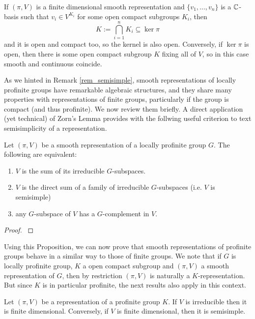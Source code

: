 \begin{rem}
    If $(\pi,V)$ is a finite dimensional smooth representation and $\{v_1,\ldots,v_n\}$ is a $\mathbb{C}$-basis such that $v_i\in V^{K_i}$ for some open compact subgroups $K_i$, then 
    $$K:=\bigcap_{i=1}^n K_i\subseteq\ker\pi$$
    and it is open and compact too, so the kernel is also open. 
    Conversely, if $\ker\pi$ is open, then there is some open compact subgroup $K$ fixing all of $V$, so in this case smooth and continuous coincide. 
\end{rem}


As we hinted in Remark \ref{rem_semisimple}, smooth representations of locally profinite groups have remarkable algebraic structures, and they share many properties with representations of finite groups, particularly if the group is compact (and thus profinite). We now review them briefly. A direct application (yet technical) of Zorn's Lemma provides with the follwing useful criterion to text semisimplicity of a representation. 

\begin{prop}\label{prop_semisimple}
    Let $(\pi,V)$ be a smooth representation of a locally profinite group $G$. The following are equivalent:
    \begin{enumerate}
        \item $V$ is the sum of its irreducible $G$-subspaces.
        \item $V$ is the direct sum of a family of irreducible $G$-subspaces (i.e. $V$ is semisimple)
        \item any $G$-subspace of $V$ has a $G$-complement in $V$.
    \end{enumerate}
\end{prop}

\begin{proof}
    \cite[2.2 Lemma]{BH1}
\end{proof}

Using this Proposition, we can now prove that smooth representations of profinite groups behave in a similar way to those of finite groups. We note that if $G$ is locally profinite group, $K$ a open compact subgroup and $(\pi,V)$ a smooth representation of $G$, then by restriction $(\pi,V)$ is naturally a $K$-representation. But since $K$ is in particular profinite, the next results also apply in this context.

\begin{prop}\label{lem_profinite_smooth}
    Let $(\pi,V)$ be a representation of a profinite group $K$. If $V$ is irreducible then it is finite dimensional. Conversely, if $V$ is finite dimensional, then it is semisimple.
\end{prop}

